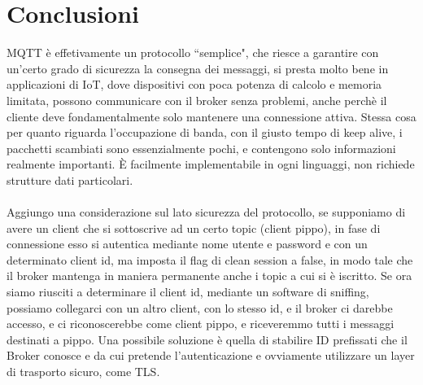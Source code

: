 \documentclass{article}
\begin{document}
\section{Conclusioni}
MQTT è effetivamente un protocollo ``semplice", che riesce a garantire con un'certo grado di sicurezza la consegna dei messaggi, si presta molto bene in applicazioni di IoT, dove dispositivi con poca potenza di calcolo e memoria limitata, possono communicare con il broker senza problemi, anche perchè il cliente deve fondamentalmente solo mantenere una connessione attiva. Stessa cosa per quanto riguarda l'occupazione di banda, con il giusto tempo di keep alive, i pacchetti scambiati sono essenzialmente pochi, e contengono solo informazioni realmente importanti. È facilmente implementabile in ogni linguaggi, non richiede strutture dati particolari.\\\\Aggiungo una considerazione sul lato sicurezza del protocollo, se supponiamo di avere un client che si sottoscrive ad un certo topic (client pippo), in fase di connessione esso si autentica mediante nome utente e password e con un determinato client id, ma imposta il flag di clean session a false, in modo tale che il broker mantenga in maniera permanente anche i topic a cui si è iscritto. Se ora siamo riusciti a determinare il client id, mediante un software di sniffing, possiamo collegarci con un altro client, con lo stesso id, e il broker ci darebbe accesso, e ci riconoscerebbe come client pippo, e riceveremmo tutti i messaggi destinati a pippo. Una possibile soluzione è quella di stabilire ID prefissati che il Broker conosce e da cui pretende l'autenticazione e ovviamente utilizzare un layer di trasporto sicuro, come TLS.
\end{document}
